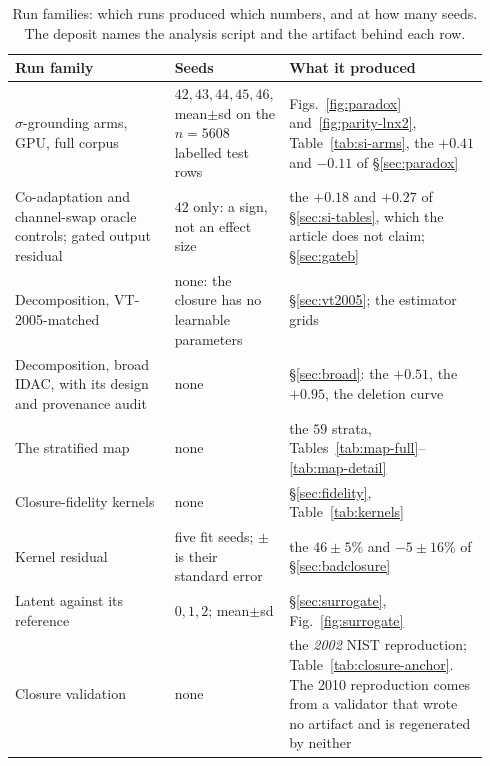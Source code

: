 \begin{table}[tp]
\centering
\caption[Run families: which runs produced which numbers, and at how many seeds]{Run families: which runs produced which numbers, and at how many seeds. The deposit names
the analysis script and the artifact behind each row.}
\label{tab:runs}
{\scriptsize
\setlength{\tabcolsep}{4pt}
\renewcommand{\arraystretch}{0.9}
\begin{tabular}{@{}L{0.32\linewidth}L{0.22\linewidth}L{0.40\linewidth}@{}}
\toprule
Run family & Seeds & What it produced \\
\midrule
$\sigma$-grounding arms, GPU, full corpus & $42,43,44,45,46$, mean$\pm$sd on the $n{=}5608$ labelled test rows &
Figs.~\ref{fig:paradox} and~\ref{fig:parity-lnx2}, Table~\ref{tab:si-arms}, the $+0.41$ and $-0.11$
of \S\ref{sec:paradox} \\
Co-adaptation and channel-swap oracle controls; gated output residual & $42$ only: a sign, not an
effect size & the $+0.18$ and $+0.27$ of \S\ref{sec:si-tables}, which the article does not
claim; \S\ref{sec:gateb} \\
Decomposition, VT-2005-matched & none: the closure has no
learnable parameters & \S\ref{sec:vt2005}; the estimator grids \\
Decomposition, broad IDAC, with its design and provenance audit & none &
\S\ref{sec:broad}: the $+0.51$, the $+0.95$, the deletion curve \\
The stratified map & none & the $59$ strata,
Tables~\ref{tab:map-full}--\ref{tab:map-detail} \\
Closure-fidelity kernels & none & \S\ref{sec:fidelity}, Table~\ref{tab:kernels} \\
Kernel residual & five fit seeds; $\pm$ is their standard error
& the $46\pm5\%$ and $-5\pm16\%$ of \S\ref{sec:badclosure} \\
Latent against its reference & $0,1,2$; mean$\pm$sd &
\S\ref{sec:surrogate}, Fig.~\ref{fig:surrogate} \\
Closure validation & none & the \emph{2002} NIST reproduction;
Table~\ref{tab:closure-anchor}. The 2010 reproduction comes from a validator that wrote no
artifact and is regenerated by neither \\

\end{tabular}}
\end{table}
